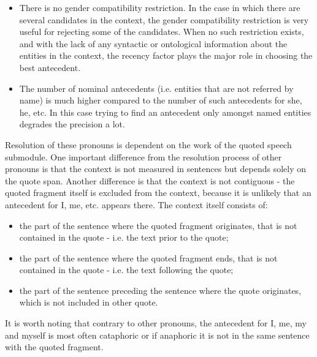   \begin{itemize}
  \item
  There is no gender compatibility restriction. In the case in which there
  are several candidates in the context, the gender compatibility
  restriction is very useful for rejecting some of the
  candidates. When no such restriction exists, and with the lack of
  any syntactic or ontological information about the entities in the
  context, the recency factor plays the major role in choosing the
  best antecedent.

  \item
  The number of nominal antecedents (i.e. entities that are not referred
  by name) is much higher compared to the number of such
  antecedents for she, he, etc. In this case trying to find an antecedent
  only amongst named entities degrades the precision a lot.
  \end{itemize}


Resolution of these pronouns is dependent on the work of the quoted speech submodule.
One important difference from the resolution process of other pronouns
is that the context is not measured in sentences but depends solely on
the quote span. Another difference is that the context is not
contiguous - the quoted fragment itself is excluded from the context,
because it is unlikely that an antecedent for I, me, etc. appears
there. The context itself consists of:
  \begin{itemize}
  \item
  the part of the sentence where the quoted fragment originates, that
is not contained in the quote - i.e. the text prior to the quote;

  \item
  the part of the sentence where the quoted fragment ends, that is not
  contained in the quote - i.e. the text following the quote;

  \item
  the part of the sentence preceding the sentence where the quote
  originates, which is not included in other quote.
  \end{itemize}

It is worth noting that contrary to other pronouns, the antecedent for
I, me, my and  myself is most often cataphoric or if anaphoric it is
not in the same sentence with the quoted fragment.

